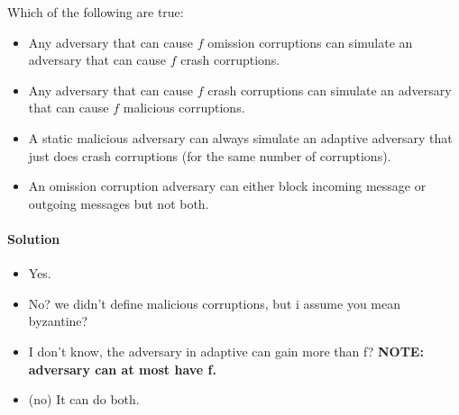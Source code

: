 \begin{xca}[Quiz 1.H]
    Which of the following are true:
    \begin{itemize} 
\item Any adversary that can cause $f$ omission corruptions can simulate an adversary that
 can cause $f$ crash corruptions.
\item  Any adversary that can cause $f$ crash corruptions can simulate an adversary that 
can cause $f$ malicious corruptions.
\item  A static malicious adversary can always simulate an adaptive 
adversary that just does crash corruptions (for the same number of corruptions).
\item  An omission corruption adversary can either block incoming message or outgoing messages but not both.
    \end{itemize}
    
\paragraph{Solution}
\begin{itemize}
    \item Yes.
    \item No? we didn't define malicious corruptions, but i assume you mean byzantine?
    \item I don't know, the adversary in adaptive can gain more than f? \bf{NOTE: adversary can at most have f.} 
    \item (no) It can do both.
\end{itemize}
\end{xca}


